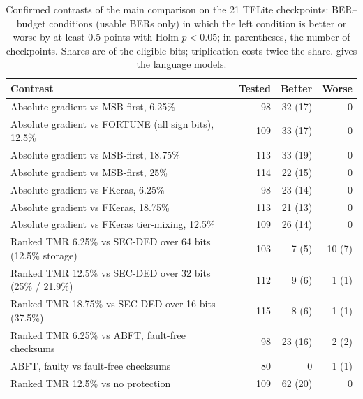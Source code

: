 \begin{table}[h]
\caption{Confirmed contrasts of the main comparison on the 21 TFLite checkpoints: BER--budget conditions (usable BERs only) in which the left condition is better or worse by at least 0.5 points with Holm $p<0.05$; in parentheses, the number of checkpoints. Shares are of the eligible bits; triplication costs twice the share.  gives the language models.}\label{tab:contrasts}
\centering\footnotesize
\begin{tabular}{l r r r}\toprule
Contrast & Tested & Better & Worse\\\midrule
Absolute gradient vs MSB-first, 6.25\% & 98 & 32 (17) & 0\\
Absolute gradient vs FORTUNE (all sign bits), 12.5\% & 109 & 33 (17) & 0\\
Absolute gradient vs MSB-first, 18.75\% & 113 & 33 (19) & 0\\
Absolute gradient vs MSB-first, 25\% & 114 & 22 (15) & 0\\
Absolute gradient vs FKeras, 6.25\% & 98 & 23 (14) & 0\\
Absolute gradient vs FKeras, 18.75\% & 113 & 21 (13) & 0\\
Absolute gradient vs FKeras tier-mixing, 12.5\% & 109 & 26 (14) & 0\\\midrule
Ranked TMR 6.25\% vs SEC-DED over 64 bits (12.5\% storage) & 103 & 7 (5) & 10 (7)\\
Ranked TMR 12.5\% vs SEC-DED over 32 bits (25\% / 21.9\%) & 112 & 9 (6) & 1 (1)\\
Ranked TMR 18.75\% vs SEC-DED over 16 bits (37.5\%) & 115 & 8 (6) & 1 (1)\\
Ranked TMR 6.25\% vs ABFT, fault-free checksums & 98 & 23 (16) & 2 (2)\\
ABFT, faulty vs fault-free checksums & 80 & 0 & 1 (1)\\
Ranked TMR 12.5\% vs no protection & 109 & 62 (20) & 0\\\bottomrule
\end{tabular}
\end{table}

